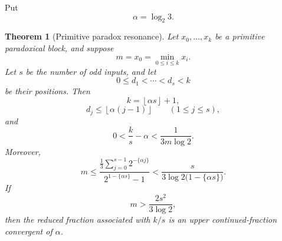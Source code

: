 \documentclass[11pt,reqno]{amsart}
\numberwithin{equation}{section}
\newtheorem{theorem}{Theorem}[section]
\theoremstyle{definition}
\theoremstyle{remark}
\newcommand{\floor}[1]{\left\lfloor #1\right\rfloor}
\begin{document}
Put
\[
\alpha=\log_2 3.
\]

\begin{theorem}[Primitive paradox resonance]\label{thm:primitive-resonance}
Let $x_0,\ldots,x_k$ be a primitive paradoxical block, and suppose
\[
m=x_0=\min_{0\le i\le k}x_i.
\]
Let $s$ be the number of odd inputs, and let
\[
0\le d_1<\cdots<d_s<k
\]
be their positions.  Then
\begin{equation}\label{eq:k-floor-alpha-s}
k=\floor{\alpha s}+1,
\end{equation}
\begin{equation}\label{eq:odd-position-bound}
d_j\le\floor{\alpha(j-1)}
\qquad(1\le j\le s),
\end{equation}
and
\begin{equation}\label{eq:resonance-bound}
0<\frac{k}{s}-\alpha
<\frac{1}{3m\log2}.
\end{equation}
Moreover,
\begin{equation}\label{eq:minimum-carry-bound}
m
\le
\frac{\displaystyle \frac13
 \sum_{j=0}^{s-1}2^{-\{\alpha j\}}}
{\displaystyle 2^{1-\{\alpha s\}}-1}
<
\frac{s}
{3\log2\bigl(1-\{\alpha s\}\bigr)}.
\end{equation}
If
\begin{equation}\label{eq:legendre-threshold}
m>\frac{2s^2}{3\log2},
\end{equation}
then the reduced fraction associated with $k/s$ is an upper continued-fraction
convergent of $\alpha$.
\end{theorem}
\end{document}
